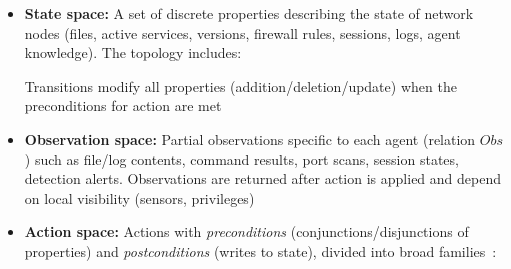 {%
\begin{itemize}
  \item \textbf{State space:} A set of discrete properties describing the state of network nodes (files, active services, versions, firewall rules, sessions, logs, agent knowledge). The topology includes:
        Transitions modify all properties (addition/deletion/update) when the preconditions for action are met
  \item \textbf{Observation space:} Partial observations specific to each agent (relation $Obs$) such as file/log contents, command results, port scans, session states, detection alerts. Observations are returned after action is applied and depend on local visibility (sensors, privileges)
  \item \textbf{Action space:} Actions with \emph{preconditions} (conjunctions/disjunctions of properties) and \emph{postconditions} (writes to state), divided into broad families~:

\end{itemize}}
